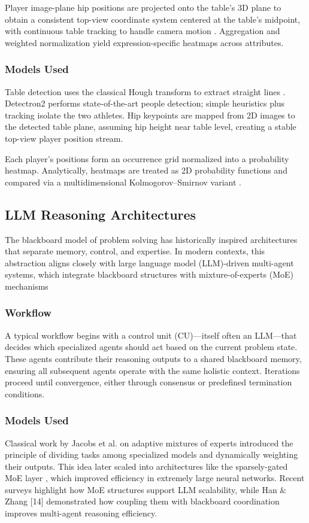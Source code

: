 \documentclass[conference]{IEEEtran}
\begin{document}
Player image-plane hip positions are projected onto the table's 3D plane to obtain a consistent top-view coordinate system centered at the table's midpoint, with continuous table tracking to handle camera motion . Aggregation and weighted normalization yield expression-specific heatmaps across attributes.\cite{haas2023heatmap}

\subsubsection{Models Used}

Table detection uses the classical Hough transform to extract straight lines \cite{haas2023heatmap}. Detectron2 performs state-of-the-art people detection; simple heuristics plus tracking isolate the two athletes. Hip keypoints are mapped from 2D images to the detected table plane, assuming hip height near table level, creating a stable top-view player position stream.

Each player's positions form an occurrence grid normalized into a probability heatmap. Analytically, heatmaps are treated as 2D probability functions and compared via a multidimensional Kolmogorov--Smirnov variant \cite{haas2023heatmap}.

\subsection{LLM Reasoning Architectures}
The blackboard model of problem solving  has historically inspired architectures that separate memory, control, and expertise\cite{hanllm}. In modern contexts, this abstraction aligns closely with large language model (LLM)-driven multi-agent systems, which integrate blackboard structures with mixture-of-experts (MoE) mechanisms\cite{hanllm}

\subsubsection{Workflow}
A typical workflow begins with a control unit (CU)—itself often an LLM—that decides which specialized agents should act based on the current problem state. These agents contribute their reasoning outputs to a shared blackboard memory, ensuring all subsequent agents operate with the same holistic context. Iterations proceed until convergence, either through consensus or predefined termination conditions.\cite{hanllm}

\subsubsection{Models Used}
Classical work by Jacobs et al. \cite{amoe} on adaptive mixtures of experts introduced the principle of dividing tasks among specialized models and dynamically weighting their outputs. This idea later scaled into architectures like the sparsely-gated MoE layer \cite{omoe}, which improved efficiency in extremely large neural networks. Recent surveys \cite{smoe} highlight how MoE structures support LLM scalability, while Han \& Zhang [14] demonstrated how coupling them with blackboard coordination improves multi-agent reasoning efficiency.
\end{document}
